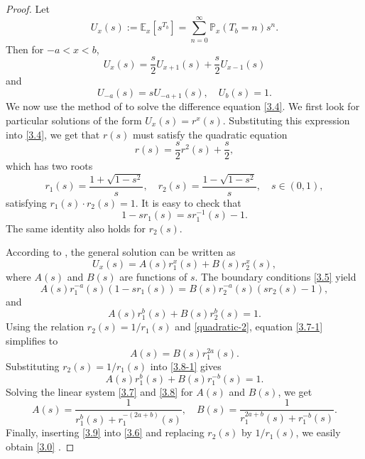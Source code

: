 \documentclass[12pt]{article}
\numberwithin{equation}{section}
\begin{document}
\begin{proof}
Let
\[
U_{x}(s):=\mathbb{E}_{x} [s^{T_{b}} ]=\sum_{n=0}^\infty \mathbb P_x(T_b=n)s^n.
\]
Then for  $-a < x < b$,
\begin{equation}\label{3.4}
U_{x}(s)=\frac{s}{2}U_{x+1}(s)+\frac{s}{2}U_{x-1}(s)
\end{equation}
and
\begin{equation}\label{3.5}
U_{-a}(s)=sU_{-a+1}(s), \quad U_{b}(s)=1.
\end{equation}
We now use the method of \cite[Chapter XIV.4]{FW} to solve the  difference equation \eqref{3.4}.
We first look for particular solutions of the form $U_{x}(s)=r ^{x}(s)$.
Substituting this expression into \eqref{3.4}, we get
that $r (s)$ must satisfy the quadratic equation
\begin{equation}\label{quadratic}
r(s)=\frac{s}{2}r^{2}(s)+\frac{s}{2},
\end{equation}
which has  two roots
\begin{equation*}
r_{1}(s)=\frac{1+\sqrt{1-s^{2}}}{s}, \quad r_{2}(s)=\frac{1-\sqrt{1-s^{2}}}{s}, \quad s \in (0,1),
\end{equation*}
satisfying $r_{1}(s) \cdot r_{2}(s)=1$. It is easy to check that
 \begin{equation}\label{quadratic-2}
1-sr_1(s)={sr_1^{-1}(s)-1}.
\end{equation}
The same identity also holds for $r_2(s)$.


According to \cite[Chapter XIV.2]{FW},
the general solution can be written  as
\begin{equation}\label{3.6}
U_{x}(s)=A(s)r_{1}^{x}(s)+B(s)r_{2}^{x}(s),
\end{equation}
where $A(s)$ and $B(s)$ are
functions of $s$. The boundary conditions \eqref{3.5} yield
\begin{equation}\label{3.7-1}
 A(s)r_{1}^{-a}(s) (1-sr_1(s))= B(s)r_{2}^{-a}(s)(sr_2(s)-1),
 \end{equation}
and
 \begin{equation}\label{3.8-1}
 A(s)r_{1}^{b}(s) + B(s)r_{2}^{b}(s)=1.
 \end{equation}
Using the  relation  $ r_{2}(s)=1/r_1(s)$ and \eqref{quadratic-2}, equation \eqref{3.7-1} simplifies to
\begin{equation}\label{3.7}
 A(s)  = B(s)r_{1}^{2a}(s).
 \end{equation}
Substituting $ r_{2}(s)=1/r_1(s)$ into   \eqref{3.8-1}  gives
 \begin{equation}\label{3.8}
 A(s)r_{1}^{b}(s) + B(s)r_{1}^{-b}(s)=1.
 \end{equation}
Solving the linear system \eqref{3.7} and \eqref{3.8} for $A(s)$ and $B(s)$, we get
 \begin{equation}\label{3.9}
 A(s)=\frac{1}{r_{1}^{b}(s)+r_{1}^{-(2a+b)}(s)}, \quad B(s)=\frac{1}{r_{1}^{2a+b}(s)+r_{1}^{-b}(s)}.
 \end{equation}
 Finally,  inserting  \eqref{3.9} into \eqref{3.6} and replacing $r_2(s)$ by $1/r_1(s)$, we easily obtain \eqref{3.0} .
 \end{proof}
\end{document}
